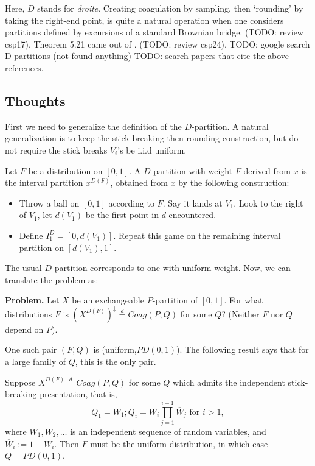 Here, $D$ stands for \emph{droite}. Creating coagulation by sampling, then `rounding' by taking the right-end point, is quite a natural operation when one considers partitions defined by excursions of a standard Brownian bridge. (TODO: review csp17). Theorem 5.21 came out of \cite{csp24}. (TODO: review csp24). 
TODO: google search D-partitions (not found anything)
TODO: search papers that cite the above references.

\subsection{Thoughts} %

First we need to generalize the definition of the $D$-partition. A natural generalization is to keep the stick-breaking-then-rounding construction, but do not require the stick breaks $V_i$'s be i.i.d uniform. 

\begin{definition}
Let $F$ be a distribution on $[0,1]$. A $D$-partition with weight $F$ derived from $x$ is the interval partition $x^{D(F)}$, obtained from $x$ by the following construction: 
\begin{itemize}
  \item Throw a ball on $[0,1]$ according to $F$. Say it lands at $V_1$. Look to the right of $V_1$, let $d(V_1)$ be the first point in $d$ encountered. 
  \item Define $I^D_1 = [0,d(V_1)]$. Repeat this game on the remaining interval partition on $[d(V_1), 1]$. 
\end{itemize}
\end{definition}
The usual $D$-partition corresponds to one with uniform weight. Now, we can translate the problem as:

\textbf{Problem.} Let $X$ be an exchangeable $P$-partition of $[0,1]$. For what distributions $F$ is $(X^{D(F)})^\downarrow \stackrel{d}{=} Coag(P, Q)$ for some $Q$? (Neither $F$ nor $Q$ depend on $P$). 

One such pair $(F,Q)$ is (uniform,$PD(0,1)$). The following result says that for a large family of $Q$, this is the only pair.

\begin{theorem}
Suppose $X^{D(F)} \stackrel{d}{=} Coag(P, Q)$ for some $Q$ which admits the independent stick-breaking presentation, that is,
$$ Q_1 = W_1; Q_i = W_i\prod_{j=1}^{i-1}\overline{W}_j \mbox{ for } i > 1, $$
where $W_1, W_2, \ldots$ is an independent sequence of random variables, and $\overline{W}_i := 1-W_i$. Then $F$ must be the uniform distribution, in which case $Q = PD(0,1)$. 
\end{theorem}


